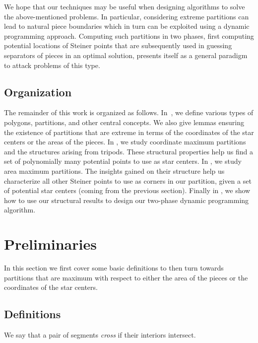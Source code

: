 \documentclass{theoretics}
\begin{document}
We hope that our techniques may be useful when designing algorithms to solve the above-mentioned problems. In particular, considering extreme partitions can lead to natural piece boundaries which in turn can be exploited using a dynamic programming approach. Computing such partitions in two phases, first computing potential locations of Steiner points that are subsequently used in guessing separators of pieces in an optimal solution, presents itself as a general paradigm to attack problems of this type.

\subsection{Organization}

The remainder of this work is organized as follows.
In~, we define various types of polygons, partitions, and other central concepts.
We also give lemmas ensuring the existence of partitions that are extreme in terms of the coordinates of the star centers or the areas of the pieces.
In , we study coordinate maximum partitions and the structures arising from tripods. These structural properties help us find a set of polynomially many potential points to use as star centers.
In , we study area maximum partitions. The insights gained on their structure help us characterize all other Steiner points to use as corners in our partition, given a set of potential star centers (coming from the previous section).
Finally in , we show how to use our structural results to design our two-phase dynamic programming algorithm.

\section{Preliminaries}\label{sec:prelim}

In this section we first cover some basic definitions to then turn towards partitions that are maximum with respect to either the area of the pieces or the coordinates of the star centers.

\subsection{Definitions}
We say that a pair of segments \emph{cross} if their interiors intersect.
\end{document}
